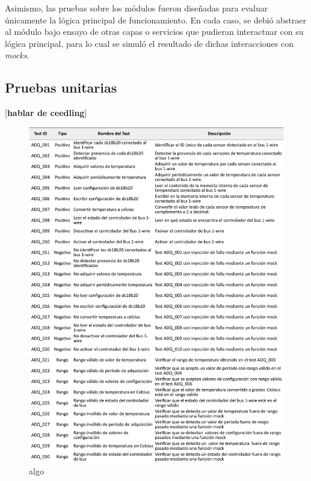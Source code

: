 Asimismo, las pruebas sobre los módulos fueron diseñadas para evaluar únicamente la lógica principal de funcionamiento.  En cada caso, se debió abstraer al módulo bajo ensayo de otras capas o servicios que pudieran interactuar con su lógica principal, para lo cual se simuló el resultado de dichas interacciones con \textit{mocks}. 


\subsection{Pruebas unitarias}
\label{subsec:unitarias}

[\textbf{hablar de ceedling}]

\begin{figure}[ht]
	\centering
	\includegraphics[width=\textwidth]{./Figures/TestADQ.pdf}
	\caption{algo}
	\label{fig:IPfC}
\end{figure}

